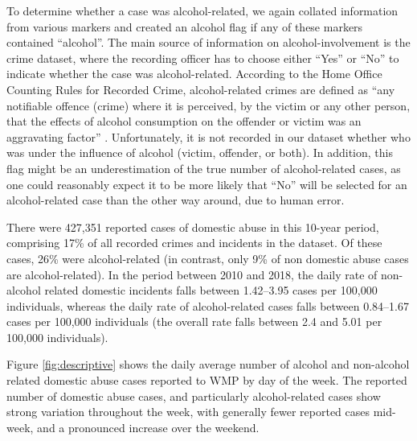 \documentclass[12pt, a4paper]{article}
\begin{document}
To determine whether a case was alcohol-related, we again collated information from various markers and created an alcohol flag if any of these markers contained ``alcohol''. The main source of information on alcohol-involvement is the crime dataset, where the recording officer has to choose either ``Yes'' or ``No'' to indicate whether the case was alcohol-related. According to the Home Office Counting Rules for Recorded Crime, alcohol-related crimes are defined as ``any notifiable offence (crime) where it is perceived, by the victim or any other person, that the
effects of alcohol consumption on the offender or victim was an aggravating factor'' . Unfortunately, it is not recorded in our dataset whether who was under the influence of alcohol (victim, offender, or both). In addition, this flag might be an underestimation of the true number of alcohol-related cases, as one could reasonably expect it to be more likely that ``No'' will be selected for an alcohol-related case than the other way around, due to human error.



 There were 427,351 reported cases of domestic abuse in this 10-year period, comprising 17\% of all recorded crimes and incidents in the dataset. Of these cases, 26\% were alcohol-related (in contrast, only 9\% of non domestic abuse cases are alcohol-related). In the period between 2010 and 2018, the daily rate of non-alcohol related domestic incidents falls between 1.42--3.95 cases per 100,000 individuals, whereas the daily rate of alcohol-related cases falls between 0.84--1.67 cases per 100,000 individuals (the overall rate falls between 2.4 and 5.01 per 100,000 individuals). 

Figure \ref{fig:descriptive} shows the daily average number of alcohol and non-alcohol related domestic abuse cases reported to WMP by day of the week. The reported number of domestic abuse cases, and particularly alcohol-related cases show strong variation throughout the week, with generally fewer reported cases mid-week, and a pronounced increase over the weekend. 
\end{document}
